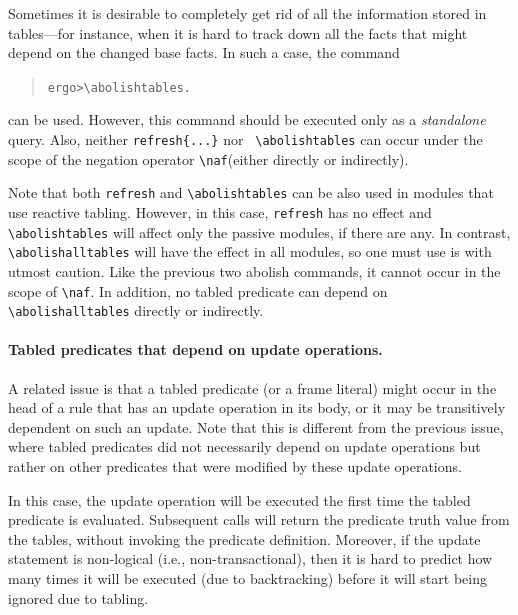 \documentclass[11pt]{article}
\newcommand{\prompt}{ergo> }
\newcommand{\bs}{\textbackslash}
\newcommand{\RULELOGNAF}{{\texttt{{\bs}naf}}\xspace}
\begin{document}
\index{\bs{}abolishtables}
\index{\bs{}abolishalltables}
Sometimes it is desirable to completely get rid of all the information
stored in tables---for instance, when it is hard to track down all the facts
that might depend on the changed base facts. In such a case, the command
\begin{quote}
\begin{alltt}
\prompt \bs{}abolishtables.
\end{alltt}
\end{quote}
can be used. However, this command should be executed only as
a \emph{standalone} query.
Also, neither {\tt refresh\{...\}} nor {\tt
  \bs{}abolishtables} can occur under the scope of the
negation operator  \RULELOGNAF (either directly or indirectly).

Note that both \texttt{refresh} and \texttt{\bs{}abolishtables} can be also
used in modules that use reactive tabling. However, in this case,
\texttt{refresh} has no effect and \texttt{\bs{}abolishtables} will affect only
the passive modules, if there are any.
In contrast, \texttt{\bs{}abolishalltables} will have the effect in all
modules, so one must use is with utmost caution. Like the previous two
abolish commands, it cannot occur in the scope of \RULELOGNAF.
In addition, no tabled predicate can depend on
\texttt{\bs{}abolishalltables} directly or indirectly.

\paragraph{Tabled predicates that depend on update operations.}
\label{page-depchk}
A related issue is that a tabled predicate (or a frame literal)
might occur in the head of a rule that has an update operation in its body,
or it may be transitively dependent on such an update. Note that this is
different from the previous issue, where tabled predicates did not
necessarily depend on update operations but rather on other predicates that
were modified by these update operations.

In this case, the update operation will be executed the first time the
tabled predicate is evaluated. Subsequent calls will return the predicate truth
value from the tables, without invoking the predicate definition.
Moreover, if the update statement is non-logical (i.e.,
non-transactional), then it is hard to predict how many times it will be
executed (due to backtracking) before it will start being ignored due to
tabling.
\end{document}
